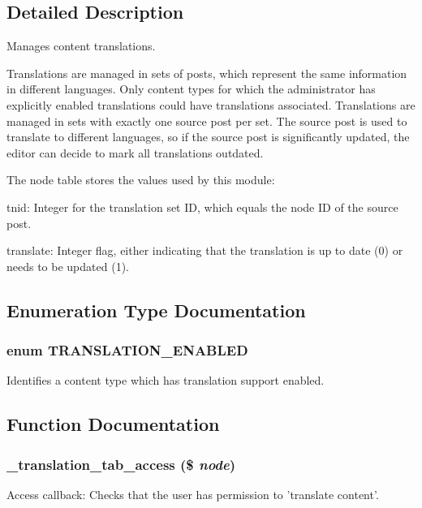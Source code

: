 \subsection{Detailed Description}
Manages content translations.

Translations are managed in sets of posts, which represent the same information in different languages. Only content types for which the administrator has explicitly enabled translations could have translations associated. Translations are managed in sets with exactly one source post per set. The source post is used to translate to different languages, so if the source post is significantly updated, the editor can decide to mark all translations outdated.

The node table stores the values used by this module:
\begin{DoxyItemize}
\item tnid: Integer for the translation set ID, which equals the node ID of the source post.
\item translate: Integer flag, either indicating that the translation is up to date (0) or needs to be updated (1). 
\end{DoxyItemize}

\subsection{Enumeration Type Documentation}
\hypertarget{translation_8module_acfb8a3bb59249a565d8de62ec82f947e}{
\subsubsection[{TRANSLATION\_\-ENABLED}]{\setlength{\rightskip}{0pt plus 5cm}enum {\bf TRANSLATION\_\-ENABLED}}}
\label{translation_8module_acfb8a3bb59249a565d8de62ec82f947e}
Identifies a content type which has translation support enabled. 

\subsection{Function Documentation}
\hypertarget{translation_8module_a3c6c1a4fc789dc7d690e0d5c2ce96e36}{
\subsubsection[{\_\-translation\_\-tab\_\-access}]{\setlength{\rightskip}{0pt plus 5cm}\_\-translation\_\-tab\_\-access (\$ {\em node})}}
\label{translation_8module_a3c6c1a4fc789dc7d690e0d5c2ce96e36}
Access callback: Checks that the user has permission to 'translate content'.

